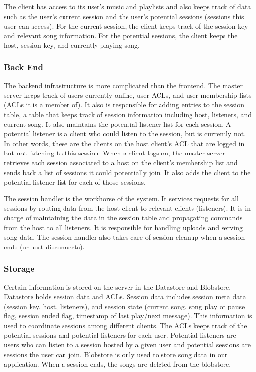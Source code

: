 The client has access to its user's music and playlists and 
also keeps track of data such as the user's current 
session and the user's potential sessions (sessions 
this user can access). For the current session, the 
client keeps track of the session key and relevant song information. 
For the potential sessions, the client keeps the host, 
session key, and currently playing song.

\subsubsection{Back End}
\label{sec:backend}
The backend infrastructure is more complicated than 
the frontend. The master server keeps track of users 
currently online, user ACLs, and user membership lists 
(ACLs it is a member of). It also is responsible for 
adding entries to the session table, a table that keeps track
of session information including host, listeners, and current song. 
It also maintains the potential listener
list for each session. A potential listener is a client 
who could listen to the session, but is currently not. 
In other words, these are the clients on the host client's 
ACL that are logged in but not listening to this 
session. When a client logs on, the master server retrieves each 
session associated to a host on the client's 
membership list and sends back a list of sessions it could
potentially join. It also adds the client to the potential
listener list for each of those sessions.

The session handler is the workhorse of the system. It 
services requests for all sessions by routing data from the 
host client to relevant clients (listeners). It is in charge 
of maintaining the data in the session table and propagating 
commands from the host to all listeners. It is responsible
for handling uploads and serving song data. The session handler 
also takes care of session cleanup when a session ends (or 
host disconnects). 

\subsubsection{Storage}
\label{sec:storage}
Certain information is stored on the server in the Datastore and Blobstore.
Datastore holds session data and ACLs. 
Session data includes session meta data (session key, host, listeners), 
and session state (current song, song play or pause flag, session ended flag, 
timestamp of last play/next message). This information is used to coordinate
sessions among different clients. The ACLs keeps track of the potential
sessions and potential listeners for each user. Potential listeners are 
users who can listen to a session hosted by a given user and potential sessions
are sessions the user can join. Blobstore is only used 
to store song data in our application. When a session ends, the songs are deleted 
from the blobstore.

